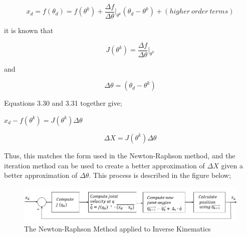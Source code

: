 \documentclass[12pt,openany,a4paper]{book}
\begin{document}
\vspace{\baselineskip}
\begin{equation}
x_d = f( \theta _d ) = f( \theta ^k ) + \frac{ \Delta f }{ \Delta \theta } |_{ \theta ^k } ( \theta_d - \theta^k ) + ( higher\ order\ terms )
\end{equation}

\vspace{\baselineskip}
it is known that

\vspace{\baselineskip}
\begin{equation}
J(\theta^k) = \frac{\Delta f}{\Delta \theta} |_{\theta^k}
\end{equation}

\vspace{\baselineskip}
and

\vspace{\baselineskip}
\begin{equation}
\Delta \theta = (\theta_d - \theta^k)
\end{equation}

\vspace{\baselineskip}
Equations 3.30 and 3.31 together give;

\vspace{\baselineskip}
\begin{center}
$x_d - f(\theta^k) = J(\theta^k) \Delta \theta$
\end{center}

\vspace{\baselineskip}
\begin{equation}
\Delta X = J(\theta^k) \Delta \theta
\end{equation}

\vspace{\baselineskip}
Thus, this matches the form used in the Newton-Raphson method, and the iteration method can be used to create a better approximation of $\Delta X$ given a better approximation of $\Delta \theta$. This process is described in the figure below;

\begin{center}
\begin{figure}[htb]
  \includegraphics[width=1.08\linewidth]{Newton-Raphson_loop.jpg}
\caption{The Newton-Raphson Method applied to Inverse Kinematics}
\end{figure}
\end{center}
\end{document}
